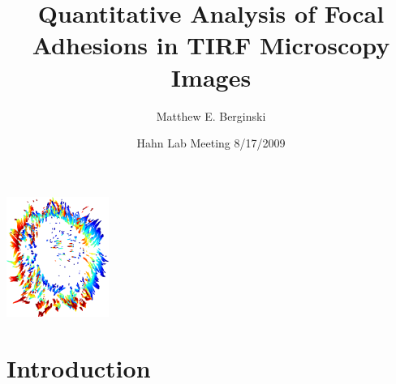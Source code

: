 \documentclass{beamer}
\title[FA Characterization]{Quantitative Analysis of Focal Adhesions in TIRF
Microscopy Images}
\author[] %
{Matthew E. Berginski}
\date[Hahn Lab Meeting 8/17/2009]{Hahn Lab Meeting 8/17/2009}
\begin{document}
\begin{frame}
	\titlepage
	\begin{center}
	\includegraphics[width=0.25\textwidth]{ghost}
	\end{center}
\end{frame}

\section{Introduction}
\end{document}
